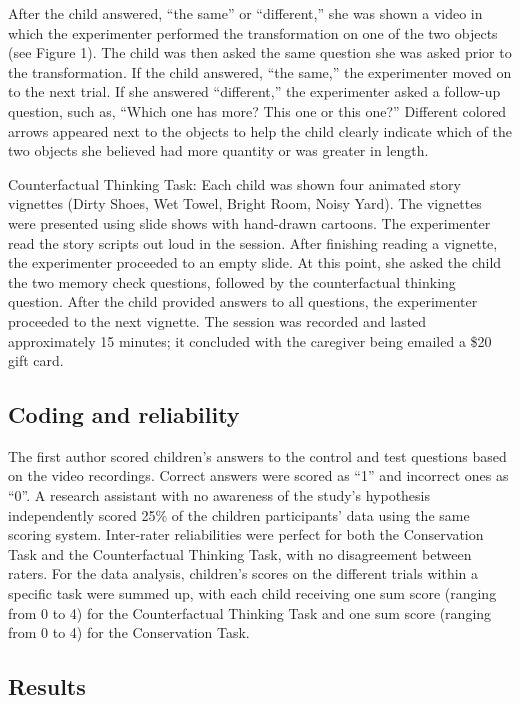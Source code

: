 \documentclass[
  doc]{apa6}
\begin{document}
After the child answered, ``the same'' or ``different,'' she was shown a video in which the experimenter performed the transformation on one of the two objects (see Figure 1). The child was then asked the same question she was asked prior to the transformation. If the child answered, ``the same,'' the experimenter moved on to the next trial. If she answered ``different,'' the experimenter asked a follow-up question, such as, ``Which one has more? This one or this one?'' Different colored arrows appeared next to the objects to help the child clearly indicate which of the two objects she believed had more quantity or was greater in length.

Counterfactual Thinking Task: Each child was shown four animated story vignettes (Dirty Shoes, Wet Towel, Bright Room, Noisy Yard). The vignettes were presented using slide shows with hand-drawn cartoons. The experimenter read the story scripts out loud in the session. After finishing reading a vignette, the experimenter proceeded to an empty slide. At this point, she asked the child the two memory check questions, followed by the counterfactual thinking question. After the child provided answers to all questions, the experimenter proceeded to the next vignette. The session was recorded and lasted approximately 15 minutes; it concluded with the caregiver being emailed a \$20 gift card.

\subsection{Coding and reliability}\label{coding-and-reliability}

The first author scored children's answers to the control and test questions based on the video recordings. Correct answers were scored as ``1'' and incorrect ones as ``0''. A research assistant with no awareness of the study's hypothesis independently scored 25\% of the children participants' data using the same scoring system. Inter-rater reliabilities were perfect for both the Conservation Task and the Counterfactual Thinking Task, with no disagreement between raters. For the data analysis, children's scores on the different trials within a specific task were summed up, with each child receiving one sum score (ranging from 0 to 4) for the Counterfactual Thinking Task and one sum score (ranging from 0 to 4) for the Conservation Task.

\subsection{Results}\label{results}
\end{document}

